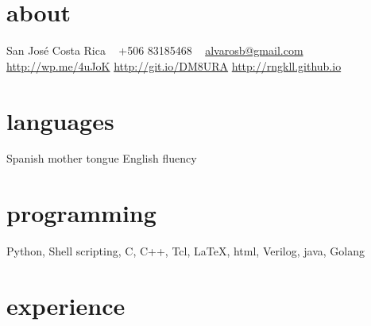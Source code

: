 \documentclass[]{friggeri-cv}
\begin{document}


\begin{aside}
  \section{about}
San José
Costa Rica
~
+506 83185468
~
\href{mailto:alvarosb@gmail.com}{alvarosb@gmail.com}
\href{http://wp.me/4uJoK}{http://wp.me/4uJoK}
\href{http://git.io/DM8URA}{http://git.io/DM8URA}
\href{http://rngkll.github.io}{http://rngkll.github.io}
\section{languages}
Spanish mother tongue
English fluency
\section{programming}
Python,
Shell scripting, C,
C++, Tcl, \LaTeX, html,
Verilog, java, Golang
\end{aside}


\section{experience}
\end{document}
